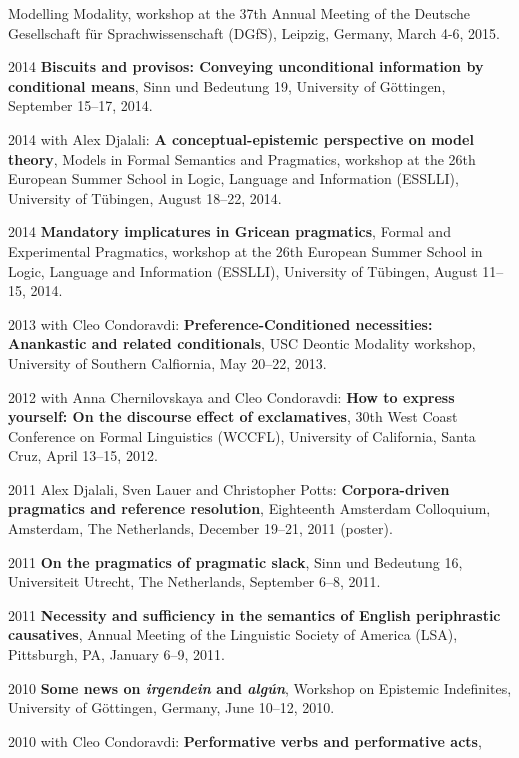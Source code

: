 \begin{dated}
		{Modelling Modality}, 
		workshop at the 37th Annual Meeting of the Deutsche Gesellschaft für Sprachwissenschaft (DGfS), 
		Leipzig, Germany, 
		March 4-6, 2015.
	\item[2014]
		 \textbf{Biscuits and provisos: Conveying unconditional information by conditional means}, 
		 {Sinn und Bedeutung 19}, 
		 University of G\"ottingen, 
		 September 15--17, 2014.
	\item[2014]
		with Alex Djalali: \textbf{A conceptual-epistemic perspective on model theory}, 
		{Models in Formal Semantics and Pragmatics}, 
		workshop at the 26th European Summer School in Logic, Language and Information (ESSLLI),
		University of T\"ubingen, 
		August 18--22, 2014.
	\item[2014]
		\textbf{Mandatory implicatures in Gricean pragmatics}, 
		{Formal and Experimental Pragmatics}, 
		workshop at the 26th European Summer School in Logic, Language and Information (ESSLLI),
		University of T\"ubingen, 
		August 11--15, 2014.
	\item[2013]
		with Cleo Condoravdi: 
		\textbf{Preference-Conditioned necessities: Anankastic and related conditionals}, 
		{USC Deontic Modality workshop}, 
		University of Southern Calfiornia, 
		May 20--22, 2013.
	\item[2012]
		with Anna Chernilovskaya and Cleo Condoravdi: 
		\textbf{How to express yourself: On the discourse effect of exclamatives}, 
		30th West Coast Conference on Formal Linguistics (WCCFL), 
		University of California, Santa Cruz, 
		April 13--15, 2012.
	\item[2011]
		Alex Djalali, Sven Lauer and Christopher Potts: \textbf{Corpora-driven pragmatics and reference resolution}, Eighteenth Amsterdam Colloquium,
		Amsterdam, The Netherlands, 
		December 19--21, 2011 (poster).
	\item[2011]
		 \textbf{On the pragmatics of pragmatic slack}, 
		 Sinn und Bedeutung 16, 
		 Universiteit Utrecht, The Netherlands, 
		 September 6--8, 2011.
	\item[2011]
		\textbf{Necessity and sufficiency in the semantics of English periphrastic causatives},
		Annual Meeting of the Linguistic Society of America (LSA), 
		Pittsburgh, PA, 
		January 6--9, 2011.
	\item[2010]
		\textbf{Some news on {\it irgendein} and {\it alg\'un}}, 
		Workshop on Epistemic Indefinites,
	    University of G\"ottingen, Germany, 
	    June 10--12, 2010.
	\item[2010]
		with Cleo Condoravdi: 
		\textbf{Performative verbs and performative acts},

\end{dated}

